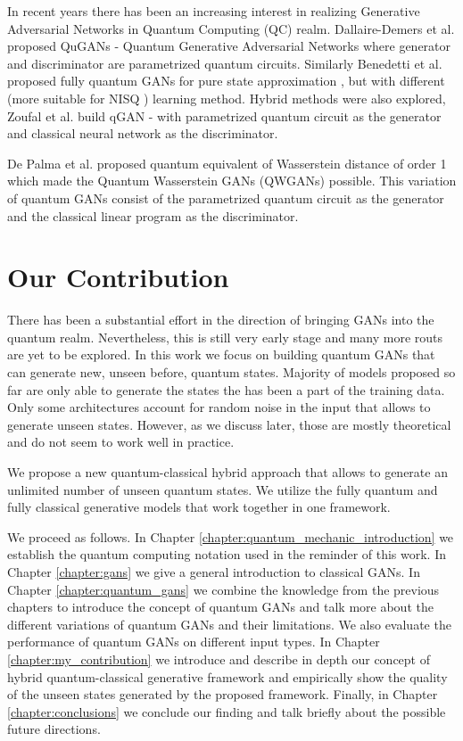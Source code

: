 In recent years there has been an increasing interest in realizing Generative
Adversarial Networks in Quantum Computing (QC) realm. Dallaire-Demers et al.
proposed QuGANs \cite{Dallaire_Demers_2018} - Quantum Generative Adversarial Networks
where generator and discriminator are parametrized quantum circuits. Similarly
Benedetti et al. proposed fully quantum GANs for pure state approximation \cite{Benedetti_2019}, but
with different (more suitable for NISQ \cite{Preskill_2018}) learning method.
Hybrid methods were also explored, Zoufal et al. build qGAN \cite{Zoufal_2019} -
with parametrized quantum circuit as the generator and classical neural network
as the discriminator. 

De Palma et al. proposed quantum equivalent of Wasserstein distance of order 1
\cite{depalma2020quantum} which made the Quantum Wasserstein GANs
(QWGANs) \cite{kiani2021quantum} possible. This variation of quantum GANs
consist of the parametrized quantum circuit as the generator and the classical linear
program as the discriminator.

\section{Our Contribution}
There has been a substantial effort in the direction of bringing GANs into the quantum
realm. Nevertheless, this is still very early stage and many more routs are yet
to be explored. In this work we focus on building quantum GANs that can generate
new, unseen before, quantum states. Majority of models proposed so far are only
able to generate the states the has been a part of the training data. Only some
architectures \cite{Dallaire_Demers_2018} account for random noise in the input
that allows to generate unseen states. However, as we discuss later, those are
mostly theoretical and do not seem to work well in practice.


We propose a new quantum-classical hybrid approach that allows to generate
an unlimited number of unseen quantum states. We utilize the fully quantum and fully
classical generative models that work together in one framework. 

We proceed as follows. In Chapter \ref{chapter:quantum_mechanic_introduction} we
establish the quantum computing notation used in the reminder of this work. In
Chapter \ref{chapter:gans} we give a general introduction to classical GANs. In
Chapter \ref{chapter:quantum_gans} we combine the knowledge from the previous
chapters to introduce the concept of quantum GANs and talk more about the
different variations of quantum GANs and their limitations. We also evaluate the
performance of quantum GANs on different input types. In Chapter
\ref{chapter:my_contribution} we introduce and describe in depth our
concept of hybrid quantum-classical generative framework and empirically show the
quality of the unseen states generated by the proposed framework. Finally, in Chapter
\ref{chapter:conclusions} we conclude our finding and talk briefly about the
possible future directions. 

